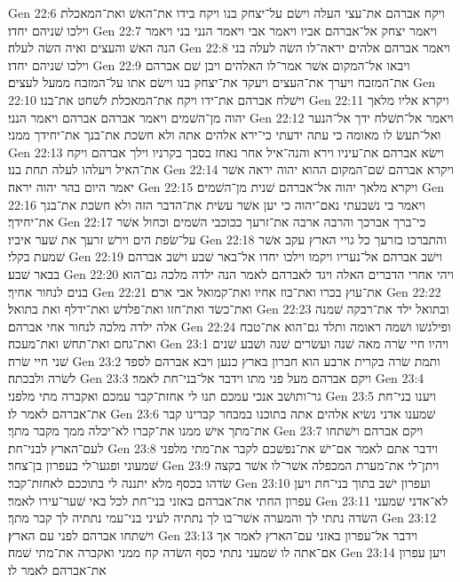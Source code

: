 Gen 22:6  ויקח אברהם את־עצי העלה וישׂם על־יצחק בנו ויקח בידו את־האשׁ ואת־המאכלת וילכו שׁניהם יחדו׃
Gen 22:7  ויאמר יצחק אל־אברהם אביו ויאמר אבי ויאמר הנני בני ויאמר הנה האשׁ והעצים ואיה השׂה לעלה׃
Gen 22:8  ויאמר אברהם אלהים יראה־לו השׂה לעלה בני וילכו שׁניהם יחדו׃
Gen 22:9  ויבאו אל־המקום אשׁר אמר־לו האלהים ויבן שׁם אברהם את־המזבח ויערך את־העצים ויעקד את־יצחק בנו וישׂם אתו על־המזבח ממעל לעצים׃
Gen 22:10  וישׁלח אברהם את־ידו ויקח את־המאכלת לשׁחט את־בנו׃
Gen 22:11  ויקרא אליו מלאך יהוה מן־השׁמים ויאמר אברהם אברהם ויאמר הנני׃
Gen 22:12  ויאמר אל־תשׁלח ידך אל־הנער ואל־תעשׂ לו מאומה כי עתה ידעתי כי־ירא אלהים אתה ולא חשׂכת את־בנך את־יחידך ממני׃
Gen 22:13  וישׂא אברהם את־עיניו וירא והנה־איל אחר נאחז בסבך בקרניו וילך אברהם ויקח את־האיל ויעלהו לעלה תחת בנו׃
Gen 22:14  ויקרא אברהם שׁם־המקום ההוא יהוה יראה אשׁר יאמר היום בהר יהוה יראה׃
Gen 22:15  ויקרא מלאך יהוה אל־אברהם שׁנית מן־השׁמים׃
Gen 22:16  ויאמר בי נשׁבעתי נאם־יהוה כי יען אשׁר עשׂית את־הדבר הזה ולא חשׂכת את־בנך את־יחידך׃
Gen 22:17  כי־ברך אברכך והרבה ארבה את־זרעך ככוכבי השׁמים וכחול אשׁר על־שׂפת הים וירשׁ זרעך את שׁער איביו׃
Gen 22:18  והתברכו בזרעך כל גויי הארץ עקב אשׁר שׁמעת בקלי׃
Gen 22:19  וישׁב אברהם אל־נעריו ויקמו וילכו יחדו אל־באר שׁבע וישׁב אברהם בבאר שׁבע׃
Gen 22:20  ויהי אחרי הדברים האלה ויגד לאברהם לאמר הנה ילדה מלכה גם־הוא בנים לנחור אחיך׃
Gen 22:21  את־עוץ בכרו ואת־בוז אחיו ואת־קמואל אבי ארם׃
Gen 22:22  ואת־כשׂד ואת־חזו ואת־פלדשׁ ואת־ידלף ואת בתואל׃
Gen 22:23  ובתואל ילד את־רבקה שׁמנה אלה ילדה מלכה לנחור אחי אברהם׃
Gen 22:24  ופילגשׁו ושׁמה ראומה ותלד גם־הוא את־טבח ואת־גחם ואת־תחשׁ ואת־מעכה׃
Gen 23:1  ויהיו חיי שׂרה מאה שׁנה ועשׂרים שׁנה ושׁבע שׁנים שׁני חיי שׂרה׃
Gen 23:2  ותמת שׂרה בקרית ארבע הוא חברון בארץ כנען ויבא אברהם לספד לשׂרה ולבכתה׃
Gen 23:3  ויקם אברהם מעל פני מתו וידבר אל־בני־חת לאמר׃
Gen 23:4  גר־ותושׁב אנכי עמכם תנו לי אחזת־קבר עמכם ואקברה מתי מלפני׃
Gen 23:5  ויענו בני־חת את־אברהם לאמר לו׃
Gen 23:6  שׁמענו אדני נשׂיא אלהים אתה בתוכנו במבחר קברינו קבר את־מתך אישׁ ממנו את־קברו לא־יכלה ממך מקבר מתך׃
Gen 23:7  ויקם אברהם וישׁתחו לעם־הארץ לבני־חת׃
Gen 23:8  וידבר אתם לאמר אם־ישׁ את־נפשׁכם לקבר את־מתי מלפני שׁמעוני ופגעו־לי בעפרון בן־צחר׃
Gen 23:9  ויתן־לי את־מערת המכפלה אשׁר־לו אשׁר בקצה שׂדהו בכסף מלא יתננה לי בתוככם לאחזת־קבר׃
Gen 23:10  ועפרון ישׁב בתוך בני־חת ויען עפרון החתי את־אברהם באזני בני־חת לכל באי שׁער־עירו לאמר׃
Gen 23:11  לא־אדני שׁמעני השׂדה נתתי לך והמערה אשׁר־בו לך נתתיה לעיני בני־עמי נתתיה לך קבר מתך׃
Gen 23:12  וישׁתחו אברהם לפני עם הארץ׃
Gen 23:13  וידבר אל־עפרון באזני עם־הארץ לאמר אך אם־אתה לו שׁמעני נתתי כסף השׂדה קח ממני ואקברה את־מתי שׁמה׃
Gen 23:14  ויען עפרון את־אברהם לאמר לו׃
